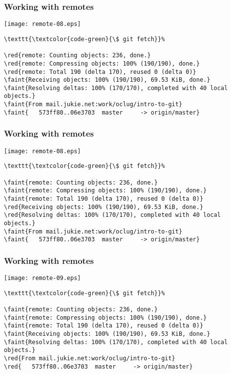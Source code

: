 \documentclass[english]{beamer}
\newcommand{\CMD}[1]{%
\texttt{\textcolor{code-green}{#1}}%
}
\newcommand{\faint}[1]{%
\textcolor{code-gray}{#1}%
}
\newcommand{\red}[1]{%
\textcolor{code-red}{#1}%
}
\begin{document}
\begin{frame}[fragile]
\frametitle{Working with remotes}

\texttt{[image: remote-08.eps]}

{\tiny
\begin{Verbatim}[commandchars=\\\{\}]
\CMD{\$ git fetch}
\red{remote: Counting objects: 236, done.}
\red{remote: Compressing objects: 100% (190/190), done.}
\red{remote: Total 190 (delta 170), reused 0 (delta 0)}
\faint{Receiving objects: 100% (190/190), 69.53 KiB, done.}
\faint{Resolving deltas: 100% (170/170), completed with 40 local objects.}
\faint{From mail.jukie.net:work/oclug/intro-to-git}
\faint{   573ff80..06e3703  master     -> origin/master}
\end{Verbatim}
}
\vspace{\textheight}
\end{frame}

\begin{frame}[fragile]
\frametitle{Working with remotes}

\texttt{[image: remote-08.eps]}

{\tiny
\begin{Verbatim}[commandchars=\\\{\}]
\CMD{\$ git fetch}
\faint{remote: Counting objects: 236, done.}
\faint{remote: Compressing objects: 100% (190/190), done.}
\faint{remote: Total 190 (delta 170), reused 0 (delta 0)}
\red{Receiving objects: 100% (190/190), 69.53 KiB, done.}
\red{Resolving deltas: 100% (170/170), completed with 40 local objects.}
\faint{From mail.jukie.net:work/oclug/intro-to-git}
\faint{   573ff80..06e3703  master     -> origin/master}
\end{Verbatim}
}
\vspace{\textheight}
\end{frame}

\begin{frame}[fragile]
\frametitle{Working with remotes}

\texttt{[image: remote-09.eps]}

{\tiny
\begin{Verbatim}[commandchars=\\\{\}]
\CMD{\$ git fetch}
\faint{remote: Counting objects: 236, done.}
\faint{remote: Compressing objects: 100% (190/190), done.}
\faint{remote: Total 190 (delta 170), reused 0 (delta 0)}
\faint{Receiving objects: 100% (190/190), 69.53 KiB, done.}
\faint{Resolving deltas: 100% (170/170), completed with 40 local objects.}
\red{From mail.jukie.net:work/oclug/intro-to-git}
\red{   573ff80..06e3703  master     -> origin/master}
\end{Verbatim}
}
\vspace{\textheight}
\end{frame}
\end{document}
